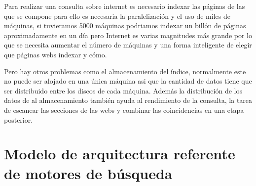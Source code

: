 \documentclass[a4paper, 11pt]{article} %
\begin{document}
	Para realizar una consulta sobre internet es necesario indexar las páginas de las que se compone para ello es necesaria la paralelización y el uso de miles de máquinas, si tuvieramos 5000 máquinas podriamos indexar un billón de páginas aproximadamente en un día pero Internet es varias magnitudes más grande por lo que se necesita aumentar el número de máquinas y una forma inteligente de elegir que páginas webs indexar y cómo.

	Pero hay otros problemas como el almacenamiento del índice, normalmente este no puede ser alojado en una única máquina asi que la cantidad de datos tiene que ser distribuido entre los discos de cada máquina. Además la distribución de los datos de al almacenamiento también ayuda al rendimiento de la consulta, la tarea de escanear las secciones de las webs y combinar las coincidencias en una etapa posterior.

	\section{Modelo de arquitectura referente de motores de búsqueda}
\end{document}

